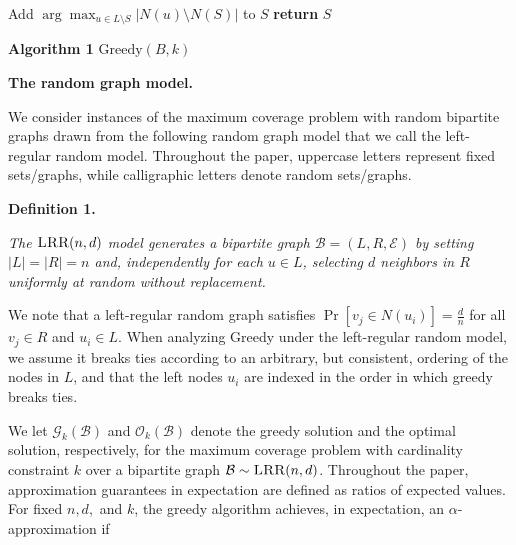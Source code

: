             
            
          \quad \enspace Add $\arg\max_{u\in L\setminus S}|N(u)\setminus N(S)|$ to $S$ \textbf{return} $S$



\textbf{Algorithm 1}  $\text{{Greedy}}(B,k)$



\par\medskip\noindent\textbf{The random graph model.}\par




We consider instances of the maximum coverage problem with random bipartite graphs drawn from the following random graph model that we call the left-regular random model. Throughout the paper, uppercase letters represent fixed sets/graphs, while calligraphic letters denote random sets/graphs.\par





\par\medskip\noindent\textbf{\textbf{Definition 1}\textbf{.}}\par



\emph{The $\textsc{LRR}(n,d)$ model generates a bipartite graph
$\mathcal{B}=(L,R,\mathcal{E})$ by setting $|L|=|R|=n$ and, independently for each $u\in L$, selecting $d$ neighbors in $R$ uniformly at random without replacement.}\par






We note that a left-regular random graph satisfies $\Pr\left[v_{j}\in N(u_{i})\right]=\frac{d}{n}$ for all $v_{j}\in R$ and $u_{i}\in L$. When analyzing Greedy under the left-regular random model, we assume it breaks ties according to an arbitrary, but consistent, ordering of the nodes in $L$, and that the left nodes $u_{i}$ are indexed in the order in which greedy breaks ties.\par




We let $\mathcal{G}_{k}(\mathcal{B})$ and $\mathcal{O}_{k}(\mathcal{B})$ denote the greedy solution and the optimal solution, respectively, for the maximum coverage problem with cardinality constraint $k$ over a bipartite graph $\mathcal{B}\sim\textsc{LRR}(n,d)$. Throughout the paper, approximation guarantees in expectation are defined as ratios of expected values. For fixed $n,d,$ and $k$, the greedy algorithm achieves, in expectation, an $\alpha$-approximation if\par


